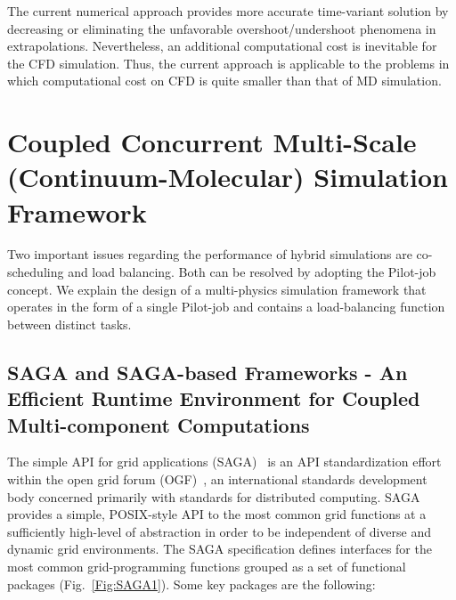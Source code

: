 \documentclass[preprint,12pt]{elsarticle}
\begin{document}
The current numerical approach provides more accurate time-variant solution
by decreasing or eliminating the unfavorable overshoot/undershoot phenomena
in extrapolations. Nevertheless, an additional computational cost is inevitable
for the CFD simulation. Thus, the current approach is applicable to the problems
in which computational cost on CFD is quite smaller than that of MD simulation.



\section{Coupled Concurrent Multi-Scale (Continuum-Molecular) Simulation Framework}
\label{sec:computational}


Two important issues regarding the performance of hybrid simulations are co-scheduling and load balancing. Both can be resolved by adopting the Pilot-job concept. We explain the design of a multi-physics simulation framework that operates in the form of a single Pilot-job and contains a load-balancing function between distinct tasks.

\subsection{SAGA and SAGA-based Frameworks - An Efficient Runtime Environment for Coupled Multi-component Computations}
\label{sec:computational_SAGAandBigJob}


The simple API for grid applications (SAGA)~\cite{saga_url} is an API standardization effort within the open grid forum (OGF)~\cite{ogf_web}, an international standards development body concerned primarily with standards for distributed computing. SAGA provides a simple, POSIX-style API to the most common grid functions at a sufficiently high-level of abstraction in order to be independent of diverse and dynamic grid environments. The SAGA specification defines interfaces for the most common grid-programming functions grouped as a set of functional packages (Fig.~\ref{Fig:SAGA1}). Some key packages are the following:
\end{document}
